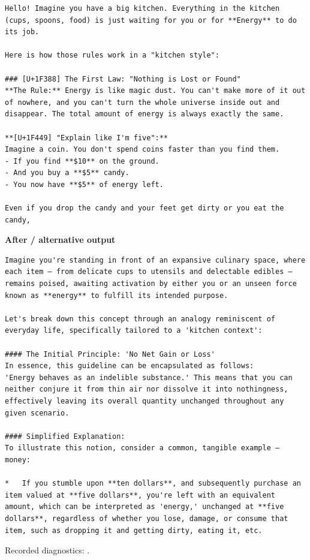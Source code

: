 \begin{Verbatim}
Hello! Imagine you have a big kitchen. Everything in the kitchen (cups, spoons, food) is just waiting for you or for **Energy** to do its job.

Here is how those rules work in a "kitchen style":

### [U+1F388] The First Law: "Nothing is Lost or Found"
**The Rule:** Energy is like magic dust. You can't make more of it out of nowhere, and you can't turn the whole universe inside out and disappear. The total amount of energy is always exactly the same.

**[U+1F449] "Explain like I'm five":**
Imagine a coin. You don't spend coins faster than you find them.
- If you find **$10** on the ground.
- And you buy a **$5** candy.
- You now have **$5** of energy left.

Even if you drop the candy and your feet get dirty or you eat the candy,
\end{Verbatim}

\textbf{After / alternative output}

\begin{Verbatim}
Imagine you're standing in front of an expansive culinary space, where each item – from delicate cups to utensils and delectable edibles – remains poised, awaiting activation by either you or an unseen force known as **energy** to fulfill its intended purpose.

Let's break down this concept through an analogy reminiscent of everyday life, specifically tailored to a 'kitchen context':

#### The Initial Principle: 'No Net Gain or Loss'
In essence, this guideline can be encapsulated as follows: 
'Energy behaves as an indelible substance.' This means that you can neither conjure it from thin air nor dissolve it into nothingness, effectively leaving its overall quantity unchanged throughout any given scenario.

#### Simplified Explanation:
To illustrate this notion, consider a common, tangible example – money:

*   If you stumble upon **ten dollars**, and subsequently purchase an item valued at **five dollars**, you're left with an equivalent amount, which can be interpreted as 'energy,' unchanged at **five dollars**, regardless of whether you lose, damage, or consume that item, such as dropping it and getting dirty, eating it, etc.
\end{Verbatim}

Recorded diagnostics:
\texttt{}.

